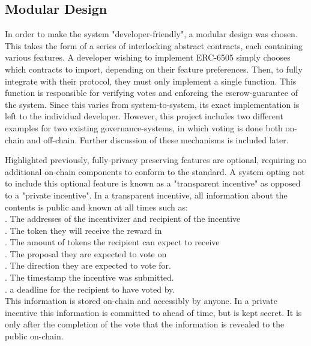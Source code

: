 \documentclass{article}
\begin{document}
\subsection{Modular Design}

In order to make the system "developer-friendly", a modular design was chosen. This takes the form of a series of interlocking abstract contracts, each containing various features. A developer wishing to implement ERC-6505 simply chooses which contracts to import, depending on their feature preferences. Then, to fully integrate with their protocol, they must only implement a single function. This function is responsible for verifying votes and enforcing the escrow-guarantee of the system. Since this varies from system-to-system, its exact implementation is left to the individual developer. However, this project includes two different examples for two existing governance-systems, in which voting is done both on-chain and off-chain. Further discussion of these mechanisms is included later.

Highlighted previously, fully-privacy preserving features are optional, requiring no additional on-chain components to conform to the standard. A system opting not to include this optional feature is known as a "transparent incentive" as opposed to a "private incentive". In a transparent incentive, all information about the contents is public and known at all times such as:\\

. The addresses of the incentivizer and recipient of the incentive\\
. The token they will receive the reward in\\
. The amount of tokens the recipient can expect to receive\\
. The proposal they are expected to vote on\\
. The direction they are expected to vote for.\\
. The timestamp the incentive was submitted.\\
. a deadline for the recipient to have voted by.\\

This information is stored on-chain and accessibly by anyone. In a private incentive this information is committed to ahead of time, but is kept secret. It is only after the completion of the vote that the information is revealed to the public on-chain.\\
\end{document}
